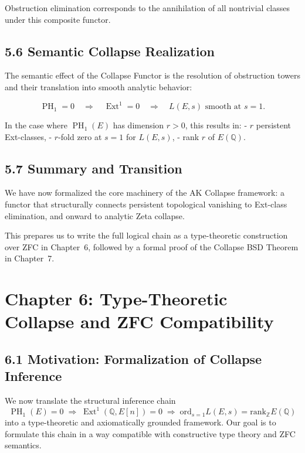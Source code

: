 \documentclass[11pt]{article}
\DeclareMathOperator{\Ext}{Ext}
\DeclareMathOperator{\PH}{PH}
\newcommand{\QQ}{\mathbb{Q}}
\newcommand{\ZZ}{\mathbb{Z}}
\begin{document}
Obstruction elimination corresponds to the annihilation of all nontrivial classes under this composite functor.

\subsection{5.6 Semantic Collapse Realization}

The semantic effect of the Collapse Functor is the resolution of obstruction towers and their translation into smooth analytic behavior:

\[
\PH_1 = 0 \quad \Rightarrow \quad \Ext^1 = 0 \quad \Rightarrow \quad L(E,s) \text{ smooth at } s = 1.
\]

In the case where $\PH_1(E)$ has dimension $r > 0$, this results in:
- $r$ persistent Ext-classes,
- $r$-fold zero at $s=1$ for $L(E,s)$,
- rank $r$ of $E(\QQ)$.

\subsection{5.7 Summary and Transition}

We have now formalized the core machinery of the AK Collapse framework:  
a functor that structurally connects persistent topological vanishing to Ext-class elimination, and onward to analytic Zeta collapse.

This prepares us to write the full logical chain as a type-theoretic construction over ZFC in Chapter~6,  
followed by a formal proof of the Collapse BSD Theorem in Chapter~7.




\section{Chapter 6: Type-Theoretic Collapse and ZFC Compatibility}

\subsection{6.1 Motivation: Formalization of Collapse Inference}

We now translate the structural inference chain
\[
\PH_1(E) = 0 \;\Rightarrow\; \Ext^1(\QQ,E[n]) = 0 \;\Rightarrow\; \mathrm{ord}_{s=1} L(E,s) = \mathrm{rank}_{\ZZ} E(\QQ)
\]
into a type-theoretic and axiomatically grounded framework.  
Our goal is to formulate this chain in a way compatible with constructive type theory and ZFC semantics.
\end{document}
